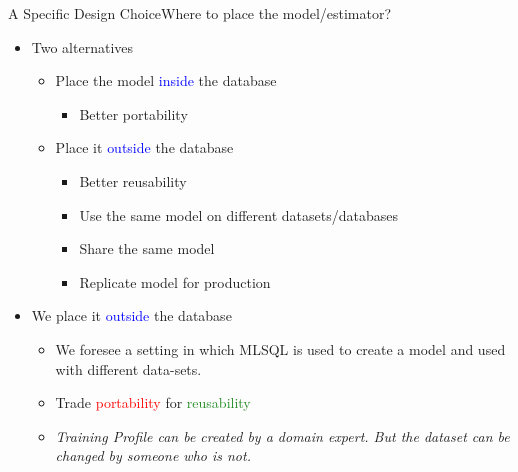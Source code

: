 \documentclass[handout, xcolor={dvipsnames}]{beamer}
\begin{document}
\begin{frame}{A Specific Design Choice}{Where to place the model/estimator?}
  \begin{itemize}
      \item<1-> Two alternatives
      \vspace{.2in}
      \begin{itemize}
          \item<2-> Place the model \textcolor{blue}{inside} the database
          \begin{itemize}
              \item<3-> Better portability
          \end{itemize}
          \vspace{.2in}
          \item<4-> Place it \textcolor{blue}{outside} the database
          \begin{itemize}
              \item<5-> Better reusability
              \item<6-> Use the same model on different datasets/databases
              \item<7-> Share the same model
              \item<8-> Replicate model for production
          \end{itemize}
      \end{itemize}
      \vspace{.2in}
      \item<9-> We place it \textcolor{blue}{outside} the database
      \begin{itemize}
          \item<10-> We foresee a setting in which MLSQL is used to create a model and used with different data-sets.
          \item<11-> Trade \textcolor{red}{portability} for \textcolor{ForestGreen}{reusability}
          \item<12-> \textit{Training Profile can be created by a domain expert. But the dataset can be changed by someone who is not.}
      \end{itemize}
  \end{itemize}
  
  
\end{frame}
\end{document}
